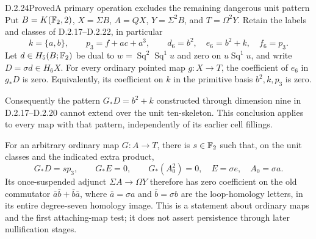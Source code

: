 \begin{claim}{D.2.24}{Proved}{A primary operation excludes the remaining dangerous unit pattern}
Put $B=K(\mathbb F_2,2)$, $X=\Sigma B$, $A=QX$, $Y=\Sigma^2B$,
and $T=\Omega^2Y$. Retain the labels and classes of
\textup{D.2.17--D.2.22}, in particular
\[
 k=\{a,b\},\qquad p_3=f+ac+a^3,\qquad
 d_6=b^2,\quad e_6=b^2+k,\quad f_6=p_3.
 \tag{D.2.24a}
\]
Let $d\in H_5(B;\mathbb F_2)$ be dual to
$w=\operatorname{Sq}^2\operatorname{Sq}^1u$ and zero on
$u\operatorname{Sq}^1u$, and write $D=\sigma d\in H_6X$.
For every ordinary pointed map $g:X\to T$, the coefficient
of $e_6$ in $g_*D$ is zero. Equivalently, its coefficient
on $k$ in the primitive basis $b^2,k,p_3$ is zero.

Consequently the pattern $G_*D=b^2+k$ constructed through
dimension nine in \textup{D.2.17--D.2.20} cannot extend over
the unit ten-skeleton. This conclusion applies to every map
with that pattern, independently of its earlier cell fillings.

For an arbitrary ordinary map $G:A\to T$, there is
$s\in\mathbb F_2$ such that, on the unit classes and the indicated
extra product,
\[
 G_*D=s p_3,\qquad G_*E=0,\qquad G_*(A_0^2)=0,
 \quad E=\sigma e,\quad A_0=\sigma a.
 \tag{D.2.24b}
\]
Its once-suspended adjunct $\Sigma A\to\Omega Y$ therefore
has zero coefficient on the old commutator
$\bar a\bar b+\bar b\bar a$, where $\bar a=\sigma a$ and
$\bar b=\sigma b$ are the loop-homology letters, in its
entire degree-seven homology image. This is a statement about
ordinary maps and the first attaching-map test; it does not
assert persistence through later nullification stages.
\end{claim}
